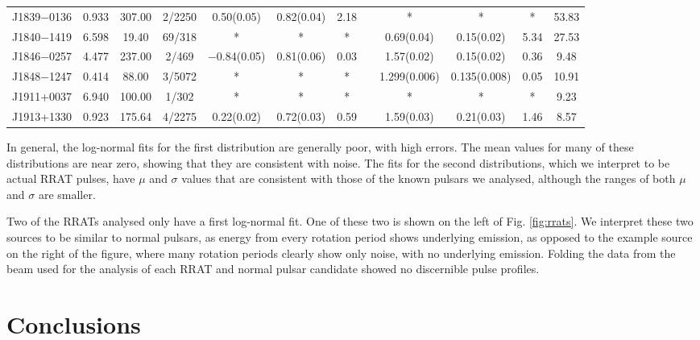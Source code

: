 \documentclass[fleqn,usenatbib]{mnras}
\begin{document}
\begin{table*}
\begin{tabular}{cccccccccccc}
J1839$-$0136 & 0.933 & 307.00 & 2/2250 & 0.50(0.05) & 0.82(0.04) & 2.18 & & * & * & * & 53.83\\
J1840$-$1419 & 6.598 & 19.40 & 69/318 & * & * & * & & 0.69(0.04) & 0.15(0.02) & 5.34 & 27.53\\
J1846$-$0257 & 4.477 & 237.00 & 2/469 & $-$0.84(0.05) & 0.81(0.06) & 0.03 & & 1.57(0.02) & 0.15(0.02) & 0.36 & 9.48\\
J1848$-$1247 & 0.414 & 88.00 & 3/5072 & * & * & * & & 1.299(0.006) & 0.135(0.008) & 0.05 & 10.91\\
J1911+0037 & 6.940 & 100.00 & 1/302 & * & * & * & & * & * & * & 9.23\\
J1913+1330 & 0.923 & 175.64 & 4/2275 & 0.22(0.02) & 0.72(0.03) & 0.59 & & 1.59(0.03) & 0.21(0.03) & 1.46 & 8.57\\
\end{tabular}
\label{table:rrats}
\end{table*}

In general, the log-normal fits for the first distribution are generally poor, with high errors. 
The mean values for many of these distributions are near zero, showing that they are consistent 
with noise. The fits for the second distributions, which we interpret to be actual RRAT 
pulses, have $\mu$ and $\sigma$ values that are consistent with those of the known 
pulsars we analysed, although the ranges of both $\mu$ and $\sigma$ are smaller.

Two of the RRATs analysed only have a first log-normal fit. One of these two is shown on the left of Fig. \ref{fig:rrats}. We interpret these two sources to be similar to normal pulsars, as energy from every rotation period shows underlying emission, as opposed to the example source on the right of the figure, where many rotation periods clearly show only noise, with no underlying emission. Folding the data from the beam used for the analysis of each RRAT and normal pulsar candidate showed no discernible pulse profiles.

\section{Conclusions}
\label{conc}
\end{document}
